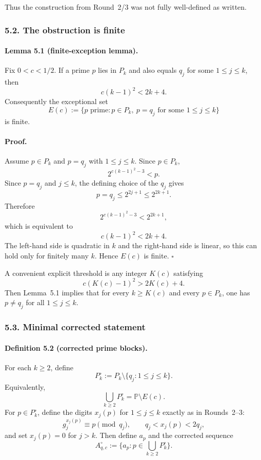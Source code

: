 Thus the construction from Round~2/3 was not fully well-defined as written.

\subsubsection*{5.2. The obstruction is finite}

\paragraph{Lemma 5.1 (finite-exception lemma).}
Fix $0<c<1/2$.
If a prime $p$ lies in $P_k$ and also equals $q_j$ for some $1\le j\le k$, then
\[
c(k-1)^2<2k+4.
\]
Consequently the exceptional set
\[
E(c):=\{p\text{ prime}: p\in P_k,\ p=q_j\text{ for some }1\le j\le k\}
\]
is finite.

\paragraph{Proof.}
Assume $p\in P_k$ and $p=q_j$ with $1\le j\le k$.
Since $p\in P_k$,
\[
2^{c(k-1)^2-3}<p.
\]
Since $p=q_j$ and $j\le k$, the defining choice of the $q_j$ gives
\[
p=q_j\le 2^{2j+1}\le 2^{2k+1}.
\]
Therefore
\[
2^{c(k-1)^2-3}<2^{2k+1},
\]
which is equivalent to
\[
c(k-1)^2<2k+4.
\]
The left-hand side is quadratic in $k$ and the right-hand side is linear, so this can hold only for finitely many $k$.
Hence $E(c)$ is finite. \hfill$\square$

\medskip

A convenient explicit threshold is any integer $K(c)$ satisfying
\[
c(K(c)-1)^2>2K(c)+4.
\]
Then Lemma~5.1 implies that for every $k\ge K(c)$ and every $p\in P_k$, one has
$p\neq q_j$ for all $1\le j\le k$.

\subsubsection*{5.3. Minimal corrected statement}

\paragraph{Definition 5.2 (corrected prime blocks).}
For each $k\ge 2$, define
\[
P_k^{\circ}:=P_k\setminus \{q_j:1\le j\le k\}.
\]
Equivalently,
\[
\bigcup_{k\ge2}P_k^{\circ}=\mathbb P\setminus E(c).
\]
For $p\in P_k^{\circ}$, define the digits $x_j(p)$ for $1\le j\le k$ exactly as in Rounds~2--3:
\[
g_j^{x_j(p)}\equiv p\pmod{q_j},
\qquad q_j< x_j(p)<2q_j,
\]
and set $x_j(p)=0$ for $j>k$.
Then define $a_p$ and the corrected sequence
\[
A_{q,c}^{\circ}:=\{a_p: p\in \bigcup_{k\ge2}P_k^{\circ}\}.
\]


